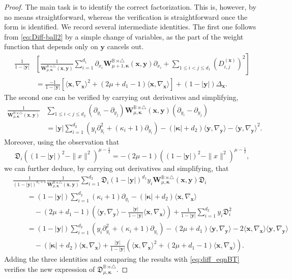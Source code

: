 \documentclass{amsart}
\theoremstyle{remark}
\def\la{{\langle}}
\def\ra{{\rangle}}
\def\fD{{\mathfrak D}}
\def\k{{\kappa}}
\def\la{{\langle}}
\def\ra{{\rangle}}
\def\yb{{\bm y}}
\def\BB{{\mathbb B}}
\def\bk{{\boldsymbol{\kappa}}}
\def\f{\frac}
\begin{document}
\begin{proof}
The main task is to identify the correct factorization. This is, however, by no means straightforward, whereas the verification is 
straightforward once the form is identified. We record several intermediate identities. The first one follows from 
\eqref{eq:Diff-ball2} by a simple change of variables, as the part of the weight function that depends only on $\yb$ cancels out. 
\begin{align*}
 \frac{1}{1-|\bm y|} & \left [
  \frac{1}{\bm W_{\mu,\bk}^{\BB\rtimes \triangle}(\bm x, \bm y)} \right. 
   \left. \sum_{i=1}^{d_1} \partial_{x_i} \bm W_{\mu+1,\bk}^{\BB\rtimes \triangle}(\bm x, \bm y) \partial_{x_i} 
   +  \sum_{1 \le i< j \le d_1} \left(D_{i,j}^{(\bm x)}\right)^2 \right]\\
& =  \frac{-1}{1-|\bm y|} \left[ \la \bm x, \nabla_{\bm x} \ra^2+(2\mu + d_1 -1) \la \bm x, \nabla_{\bm x} \ra   \right]+  (1-|\bm y|) \Delta_{\bm x}.
\end{align*}
The second one can be verified by carrying out derivatives and simplifying, 
\begin{align*}
 \frac{1}{\bm W_{\mu,\bk}^{\BB\rtimes \triangle}(\bm x, \bm y)}&  \sum_{1\le i< j \le d_2} (\partial_{y_i} - \partial_{y_j}) 
 \bm W_{\mu,\bk}^{\BB\rtimes \triangle}(\bm x, \bm y)   (\partial_{y_i} - \partial_{y_j}) \\
& = |\bm y|  \sum_{i=1}^{d_2} \left(y_i \partial_{y_i}^2 + (\k_i+1) \partial_{y_i} \right) - (|\bk| + d_2) \la \bm y, \nabla_{\bm y} \ra 
- \la \bm y, \nabla_{\bm y} \ra^2.
\end{align*}
Moreover, using the observation that 
$$
   \fD_i \left((1-|\bm y|)^2 - \|x\|^2\right)^{\mu - \f12} = - (2\mu -1) \left((1-|\bm y|)^2 - \|x\|^2\right)^{\mu - \f12},
$$
we can further deduce, by carrying out derivatives and simplifying, that  
\begin{align*}
 & \frac{1}{(1-|\bm y|)^{d_1+1}} \frac{1}{\bm W_{\mu,\bk}^{\BB\rtimes \triangle}(\bm x, \bm y)}  \sum_{i=1}^{d_2}  
\fD_i  (1-|\bm y|)^{d_1} y_i \bm W_{\mu,\bk}^{\BB\rtimes \triangle}(\bm x, \bm y) \fD_i \\
&\qquad = (1-|\bm y|) \sum_{i=1}^{d_2} (\k_i+1) \partial_{y_i} - (|\bk|+d_2) \la \bm x, \nabla_{\bm x} \ra \\
  &\qquad \quad 
  - (2\mu + d_1-1) \left( \la \bm y, \nabla_{\bm y} \ra  - \frac{|\bm y|} {1-|\bm y|}  \la \bm x,  \nabla_{\bm x} \ra\right)  
  + \frac{1}{1-|\bm y|} \sum_{i=1}^{d_2}y_i \fD_i^2 \\
&\qquad = (1-|\bm y|) \sum_{i=1}^{d_2} \left(y_i \partial_{y_i}^2 + (\k_i+1) \partial_{y_i} \right) - (2\mu + d_1) \la \bm y, \nabla_{\bm y} \ra 
- 2 \la \bm x, \nabla_{\bm x} \ra \la \bm y, \nabla_{\bm y} \ra  \\
& \qquad \quad - (|\bk| + d_2) \la \bm x, \nabla_{\bm x}\ra + \frac{|\bm y|}{1-|\bm y|} \left(\la \bm x, \nabla_{\bm x} \ra^2+ (2\mu+d_1-1) \la \bm x, \nabla_{\bm x}\ra  \right). 
\end{align*}
Adding the three identities and comparing the results with \eqref{eq:diff_eqnBT} verifies the new expression of 
$\fD_{\mu,\bk}^{\BB\rtimes \triangle}$.  
\end{proof}
\end{document}
